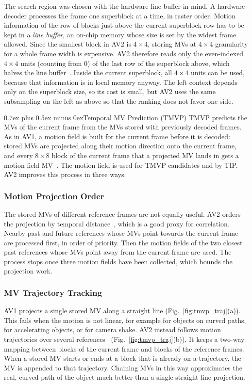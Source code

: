 \documentclass[journal]{IEEEtran}
\makeatletter
\def\subsection{\@startsection{subsection}{2}{\z@}{2.5ex plus 1ex minus 1ex}%
{0.7ex plus 0.5ex minus 0ex}{\normalfont\normalsize\itshape}}%
\makeatother
\begin{document}
The search region was chosen with the hardware line buffer in mind. A hardware
decoder processes the frame one superblock at a time, in raster order. Motion
information of the row of blocks just above the current superblock row has to
be kept in a \emph{line buffer}, an on-chip memory whose size is set by the
widest frame allowed. Since the smallest block in AV2 is $4{\times}4$, storing
MVs at $4{\times}4$ granularity for a whole frame width is expensive. AV2
therefore reads only the even-indexed $4{\times}4$ units (counting from 0) of
the last row of the superblock above, which halves the line
buffer~\cite{cwgF050}. Inside the
current superblock, all $4{\times}4$ units can be used, because that
information is in local memory anyway. The left context depends only on the
superblock size, so its cost is small, but AV2 uses the same subsampling on the
left as above so that the ranking does not favor one side.

\subsection{Temporal MV Prediction (TMVP)}
\label{sec:tmvp}
TMVP predicts the MVs of the current frame from the MVs stored with
previously decoded frames. As in AV1, a motion field is built for the current
frame before it is decoded: stored MVs are projected along their motion
direction onto the current frame, and every $8{\times}8$ block of the current
frame that a projected MV lands in gets a motion field MV~\cite{MVref}. The
motion field is used for TMVP candidates and by TIP. AV2 improves this process
in three ways.

\subsubsection{Motion Projection Order}
The stored MVs of different reference frames are not equally useful. AV2
orders the projection by temporal distance~\cite{cwgB049}, which is a good proxy for
correlation. Nearby past and future references whose MVs point towards the
current frame are processed first, in order of priority. Then the motion
fields of the two closest past references whose MVs point away from the
current frame are used. The process stops once three motion fields have been
collected, which bounds the projection work.

\subsubsection{MV Trajectory Tracking}
AV1 projects a single stored MV along a straight line
(Fig.~\ref{fig:tmvp_traj}(a)). This fails when the motion is not linear, for
example for objects on curved paths, for accelerating objects, or for camera
shake. AV2 instead follows motion trajectories over several
references~\cite{cwgE115}
(Fig.~\ref{fig:tmvp_traj}(b)). It keeps a two-way mapping between blocks of
the current frame and blocks of the reference frames. When a stored MV starts
or ends at a block that is already on a trajectory, the MV is appended to that
trajectory. Chaining MVs in this way approximates the real, curved path of the
object much better than a single straight-line projection.
\end{document}
